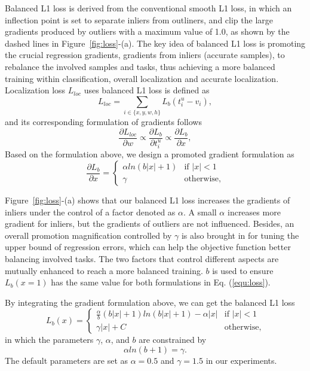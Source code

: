 \documentclass[10pt,twocolumn,letterpaper]{article}
\begin{document}
Balanced L1 loss is derived from the conventional smooth L1 loss,
in which an inflection point is set to separate inliers from outliners, and clip the large gradients produced by outliers with a maximum value of 1.0, as shown by the dashed lines in Figure~\ref{fig:loss}-(a).
The key idea of balanced L1 loss is promoting the crucial regression gradients,
\ie gradients from inliers (accurate samples), to rebalance the involved samples and tasks, thus achieving a more balanced training within classification, overall localization and accurate localization.
Localization loss $L_{loc}$ uses balanced L1 loss is defined as
\begin{equation}
	\label{equ:loc}
	L_{loc} = \sum_{i\in\{x,y,w,h\}}{L_{b}(t_{i}^{u} - v_i)},
\end{equation}
and its corresponding formulation of gradients follows
\begin{equation}
	\label{equ:partial}
	\frac{\partial{L_{loc}}}{\partial{w}} \varpropto
	\frac{\partial{L_{b}}}{\partial{t_i^u}} \varpropto
	\frac{\partial{L_{b}}}{\partial{x}},
\end{equation}
Based on the formulation above, we design a promoted gradient formulation as
\begin{equation}
	\label{equ:gradient}
	\frac{\partial{L_{b}}}{\partial{x}} =
	\begin{cases}
		\alpha ln(b|x| + 1) & \text{if $|x| < 1$} \\
		\gamma  & \text{otherwise},
	\end{cases}
\end{equation}

Figure~\ref{fig:loss}-(a) shows that our balanced L1 loss increases the gradients of inliers under the control of a factor denoted as $\alpha$.
A small $\alpha$ increases more gradient for inliers, but the gradients of outliers are not influenced.
Besides, an overall promotion magnification controlled by $\gamma$ is also brought in for tuning the upper bound of regression errors, which can help the objective function better balancing involved tasks.
The two factors that control different aspects are mutually enhanced to reach a more balanced training.
$b$ is used to ensure $L_{b}(x=1)$ has the same value for both formulations in Eq. (\ref{equ:loss}).

By integrating the gradient formulation above, we can get the balanced L1 loss
\begin{equation}
	\label{equ:loss}
	L_{b}(x) =
	\begin{cases}
		\frac{\alpha}{b}(b|x| + 1)ln(b|x| + 1) - \alpha |x|  & \text{if $|x| < 1$}\\
		\gamma|x| + C  & \text{otherwise},
	\end{cases}
\end{equation}
in which the parameters $\gamma$, $\alpha$, and $b$ are constrained by
\begin{equation}
	\alpha ln(b+1) = \gamma.
\end{equation}
The default parameters are set as $\alpha = 0.5$ and $\gamma = 1.5$ in our experiments.
 
\end{document}
